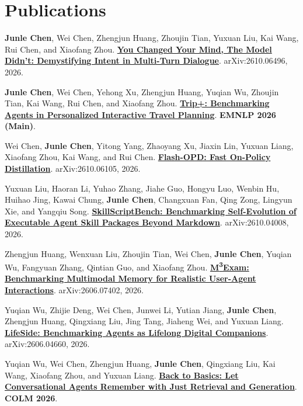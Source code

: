 \documentclass[10pt,a4paper]{article}
\begin{document}
\section*{Publications}

\begin{enumerate}[label={[\arabic*]},leftmargin=18pt,itemsep=3pt,topsep=1pt]
\item \textbf{Junle Chen}, Wei Chen, Zhengjun Huang, Zhoujin Tian, Yuxuan Liu, Kai Wang, Rui Chen, and Xiaofang Zhou. \href{https://arxiv.org/abs/2610.06496v1}{\textbf{You Changed Your Mind, The Model Didn't: Demystifying Intent in Multi-Turn Dialogue}}. arXiv:2610.06496, 2026.
\item \textbf{Junle Chen}, Wei Chen, Yehong Xu, Zhengjun Huang, Yuqian Wu, Zhoujin Tian, Kai Wang, Rui Chen, and Xiaofang Zhou. \href{https://arxiv.org/abs/2606.21169}{\textbf{Trip+: Benchmarking Agents in Personalized Interactive Travel Planning}}. \textbf{EMNLP 2026 (Main)}.
\item Wei Chen, \textbf{Junle Chen}, Yitong Yang, Zhaoyang Xu, Jiaxin Lin, Yuxuan Liang, Xiaofang Zhou, Kai Wang, and Rui Chen. \href{https://arxiv.org/abs/2610.06105}{\textbf{Flash-OPD: Fast On-Policy Distillation}}. arXiv:2610.06105, 2026.
\item Yuxuan Liu, Haoran Li, Yuhao Zhang, Jiahe Guo, Hongyu Luo, Wenbin Hu, Huihao Jing, Kawai Chung, \textbf{Junle Chen}, Changxuan Fan, Qing Zong, Lingyun Xie, and Yangqiu Song. \href{https://arxiv.org/abs/2610.04008}{\textbf{SkillScriptBench: Benchmarking Self-Evolution of Executable Agent Skill Packages Beyond Markdown}}. arXiv:2610.04008, 2026.
\item Zhengjun Huang, Wenxuan Liu, Zhoujin Tian, Wei Chen, \textbf{Junle Chen}, Yuqian Wu, Fangyuan Zhang, Qintian Guo, and Xiaofang Zhou. \href{https://arxiv.org/abs/2606.07402}{\textbf{M\textsuperscript{3}Exam: Benchmarking Multimodal Memory for Realistic User-Agent Interactions}}. arXiv:2606.07402, 2026.
\item Yuqian Wu, Zhijie Deng, Wei Chen, Junwei Li, Yutian Jiang, \textbf{Junle Chen}, Zhengjun Huang, Qingxiang Liu, Jing Tang, Jiaheng Wei, and Yuxuan Liang. \href{https://arxiv.org/abs/2606.04660}{\textbf{LifeSide: Benchmarking Agents as Lifelong Digital Companions}}. arXiv:2606.04660, 2026.
\item Yuqian Wu, Wei Chen, Zhengjun Huang, \textbf{Junle Chen}, Qingxiang Liu, Kai Wang, Xiaofang Zhou, and Yuxuan Liang. \href{https://arxiv.org/abs/2604.11628}{\textbf{Back to Basics: Let Conversational Agents Remember with Just Retrieval and Generation}}. \textbf{COLM 2026}.

\end{enumerate}
\end{document}
